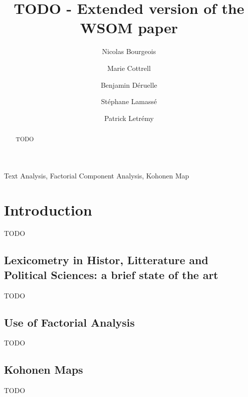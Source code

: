 \documentclass[runningheads,a4paper]{llncs}
\newcommand{\keywords}[1]{\par\addvspace\baselineskip
\noindent\keywordname\enspace\ignorespaces#1}
\begin{document}
\mainmatter  

\title{ TODO - Extended version of the WSOM paper}


\author{Nicolas Bourgeois
\and Marie Cottrell \and Benjamin D\'eruelle 
\and St\'ephane Lamass\'e \and Patrick Letr\'emy}


\maketitle


\begin{abstract}
TODO
\end{abstract}

\keywords{Text Analysis, Factorial Component Analysis, Kohonen Map}

\section{Introduction}
\setcounter{footnote}{0}

TODO

\subsection{Lexicometry in Histor, Litterature and Political Sciences: a brief state of the art}

TODO

\subsection{Use of Factorial Analysis}

TODO

\subsection{Kohonen Maps}

TODO
\end{document}
